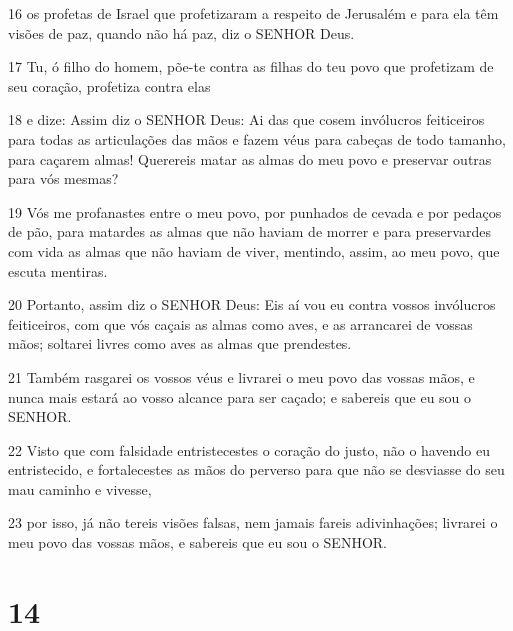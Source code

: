 \par 16 os profetas de Israel que profetizaram a respeito de Jerusalém e para ela têm visões de paz, quando não há paz, diz o SENHOR Deus.
\par 17 Tu, ó filho do homem, põe-te contra as filhas do teu povo que profetizam de seu coração, profetiza contra elas
\par 18 e dize: Assim diz o SENHOR Deus: Ai das que cosem invólucros feiticeiros para todas as articulações das mãos e fazem véus para cabeças de todo tamanho, para caçarem almas! Querereis matar as almas do meu povo e preservar outras para vós mesmas?
\par 19 Vós me profanastes entre o meu povo, por punhados de cevada e por pedaços de pão, para matardes as almas que não haviam de morrer e para preservardes com vida as almas que não haviam de viver, mentindo, assim, ao meu povo, que escuta mentiras.
\par 20 Portanto, assim diz o SENHOR Deus: Eis aí vou eu contra vossos invólucros feiticeiros, com que vós caçais as almas como aves, e as arrancarei de vossas mãos; soltarei livres como aves as almas que prendestes.
\par 21 Também rasgarei os vossos véus e livrarei o meu povo das vossas mãos, e nunca mais estará ao vosso alcance para ser caçado; e sabereis que eu sou o SENHOR.
\par 22 Visto que com falsidade entristecestes o coração do justo, não o havendo eu entristecido, e fortalecestes as mãos do perverso para que não se desviasse do seu mau caminho e vivesse,
\par 23 por isso, já não tereis visões falsas, nem jamais fareis adivinhações; livrarei o meu povo das vossas mãos, e sabereis que eu sou o SENHOR.

\chapter{14}

